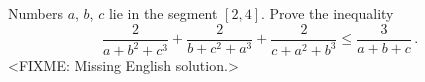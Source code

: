 \problem{}
Numbers $a$, $b$, $c$ lie in the segment $[2, 4]$.
Prove the inequality
\[
    \frac{2}{a + b^2 + c^3}
    +
    \frac{2}{b + c^2 + a^3}
    +
    \frac{2}{c + a^2 + b^3}
\leq
    \frac{3}{a + b + c}
\,.\]
\solution
<FIXME: Missing English solution.>
\endproblem

